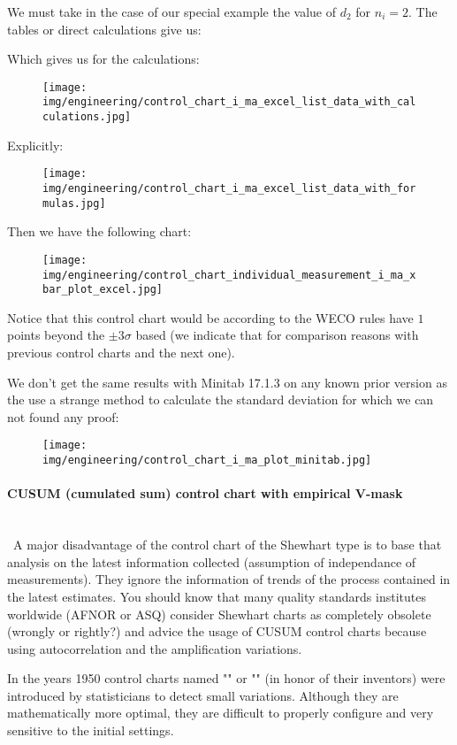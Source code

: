 	We must take in the case of our special example the value of $d_2$ for $n_i=2$. The tables or direct calculations give us:
	
	Which gives us for the calculations:
	\begin{figure}[H]
		\centering
		\texttt{[image: img/engineering/control\_chart\_i\_ma\_excel\_list\_data\_with\_calculations.jpg]}
	\end{figure}
	Explicitly:
	\begin{figure}[H]
		\centering
		\texttt{[image: img/engineering/control\_chart\_i\_ma\_excel\_list\_data\_with\_formulas.jpg]}
	\end{figure}
	Then we have the following chart:
	\begin{figure}[H]
		\centering
		\texttt{[image: img/engineering/control\_chart\_individual\_measurement\_i\_ma\_xbar\_plot\_excel.jpg]}
	\end{figure}
	Notice that this control chart would be according to the WECO rules have $1$ points beyond the $\pm 3\sigma$ based (we indicate that for comparison reasons with previous control charts and the next one).
	
	We don't get the same results with Minitab 17.1.3 on any known prior version as the use a strange method to calculate the standard deviation for which we can not found any proof:
	\begin{figure}[H]
		\centering
		\texttt{[image: img/engineering/control\_chart\_i\_ma\_plot\_minitab.jpg]}
	\end{figure}
	
	\paragraph{CUSUM (cumulated sum) control chart with empirical V-mask}\mbox{}\\\
	A major disadvantage of the control chart of the Shewhart type is to base that analysis on the latest information collected (assumption of independance of measurements). They ignore the information of trends of the process contained in the latest estimates. You should know that many quality standards institutes worldwide (AFNOR or ASQ) consider Shewhart charts as completely obsolete (wrongly or rightly?) and advice the usage of CUSUM control charts because using autocorrelation and the amplification variations.

	In the years 1950 control charts named "" or "" (in honor of their inventors) were introduced by statisticians to detect small variations. Although they are mathematically more optimal, they are difficult to properly configure and very sensitive to the initial settings.

